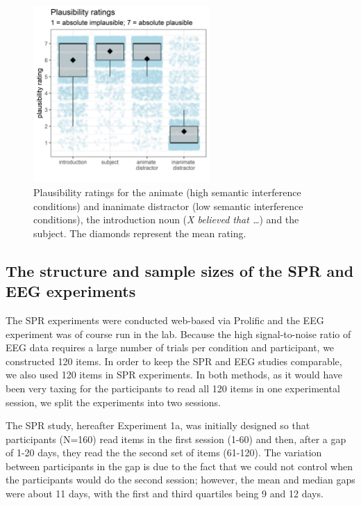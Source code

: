\documentclass[a4paper, man, floatsintext]{apa7}
\begin{document}
\begin{figure}[H]
\caption{Plausibility ratings for the animate (high semantic interference conditions) and inanimate distractor (low semantic interference conditions), the introduction noun (\textit{X believed that \dots}) and the subject. The diamonds represent the mean rating.}\label{fig:plausibility_rating}
\centering
\includegraphics[width=0.6\textwidth]{images/pandora_plausibility_ratings.jpg}
\end{figure}


\subsection{The structure and sample sizes of the SPR and EEG experiments}

The SPR experiments were conducted web-based via Prolific and the EEG experiment was of course run in the lab.  Because the high signal-to-noise ratio of EEG data requires a large number of trials per condition and participant, we constructed 120 items. In order to keep the SPR and EEG studies comparable, we also used 120 items in SPR experiments. In both methods, as it would have been very taxing for the participants to read all 120 items in one experimental session, we split the experiments into two sessions. 

The SPR study, hereafter Experiment 1a, was initially designed so that participants  (N=160) read items in the first session (1-60) and then, after a gap of 1-20 days, they read the the second set of items (61-120). The variation between participants in the gap is due to the fact that we could not control when the participants would do the second session; however, the mean and median gaps were  about 11 days, with the first and third quartiles being 9 and 12 days.
\end{document}
